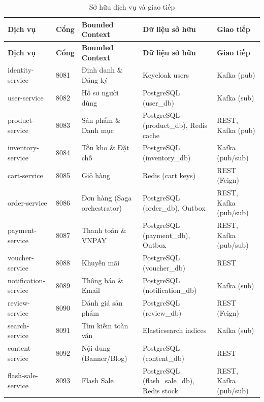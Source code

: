 \documentclass[../DoAn.tex]{subfiles}
\begin{document}
{{%
\small\setlength{\tabcolsep}{3pt}\renewcommand{\arraystretch}{1.15}%
\begin{longtable}{|p{2.7cm}|p{1.0cm}|p{3.0cm}|p{4.9cm}|p{2.3cm}|}
\caption{Sở hữu dịch vụ và giao tiếp}
\label{table:service-ownership} \\
\hline
\textbf{Dịch vụ} & \textbf{Cổng} & \textbf{Bounded Context} & \textbf{Dữ liệu sở hữu} & \textbf{Giao tiếp} \\ \hline
\endfirsthead
\hline
\textbf{Dịch vụ} & \textbf{Cổng} & \textbf{Bounded Context} & \textbf{Dữ liệu sở hữu} & \textbf{Giao tiếp} \\ \hline
\endhead
identity-service  & 8081 & Định danh \& Đăng ký     & Keycloak users                              & Kafka (pub) \\ \hline
user-service      & 8082 & Hồ sơ người dùng          & PostgreSQL (user\_db)                       & Kafka (sub) \\ \hline
product-service   & 8083 & Sản phẩm \& Danh mục      & PostgreSQL (product\_db), Redis cache       & REST, Kafka (pub) \\ \hline
inventory-service & 8084 & Tồn kho \& Đặt chỗ       & PostgreSQL (inventory\_db)                  & Kafka (pub/sub) \\ \hline
cart-service      & 8085 & Giỏ hàng                  & Redis (cart keys)                           & REST (Feign) \\ \hline
order-service     & 8086 & Đơn hàng (Saga orchestrator) & PostgreSQL (order\_db), Outbox           & REST, Kafka (pub/sub) \\ \hline
payment-service   & 8087 & Thanh toán \& VNPAY       & PostgreSQL (payment\_db), Outbox            & REST, Kafka (pub/sub) \\ \hline
voucher-service   & 8088 & Khuyến mãi                & PostgreSQL (voucher\_db)                    & REST \\ \hline
notification-service & 8089 & Thông báo \& Email    & PostgreSQL (notification\_db)               & Kafka (sub) \\ \hline
review-service    & 8090 & Đánh giá sản phẩm         & PostgreSQL (review\_db)                     & REST (Feign) \\ \hline
search-service    & 8091 & Tìm kiếm toàn văn         & Elasticsearch indices                       & Kafka (sub) \\ \hline
content-service   & 8092 & Nội dung (Banner/Blog)    & PostgreSQL (content\_db)                    & REST \\ \hline
flash-sale-service & 8093 & Flash Sale               & PostgreSQL (flash\_sale\_db), Redis stock   & REST, Kafka (pub/sub) \\ \hline
\end{longtable}
}

}
\end{document}
